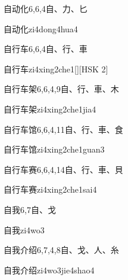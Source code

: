 \begin{entry}{自动化}{6,6,4}{⾃、⼒、⼔}
  \begin{phonetics}{自动化}{zi4dong4hua4}
  \end{phonetics}
\end{entry}

\begin{entry}{自行车}{6,6,4}{⾃、⾏、⾞}
  \begin{phonetics}{自行车}{zi4xing2che1}[][HSK 2]
  \end{phonetics}
\end{entry}

\begin{entry}{自行车架}{6,6,4,9}{⾃、⾏、⾞、⽊}
  \begin{phonetics}{自行车架}{zi4xing2che1jia4}
  \end{phonetics}
\end{entry}

\begin{entry}{自行车馆}{6,6,4,11}{⾃、⾏、⾞、⾷}
  \begin{phonetics}{自行车馆}{zi4xing2che1guan3}
  \end{phonetics}
\end{entry}

\begin{entry}{自行车赛}{6,6,4,14}{⾃、⾏、⾞、⾙}
  \begin{phonetics}{自行车赛}{zi4xing2che1sai4}
  \end{phonetics}
\end{entry}

\begin{entry}{自我}{6,7}{⾃、⼽}
  \begin{phonetics}{自我}{zi4wo3}
  \end{phonetics}
\end{entry}

\begin{entry}{自我介绍}{6,7,4,8}{⾃、⼽、⼈、⽷}
  \begin{phonetics}{自我介绍}{zi4wo3jie4shao4}
  \end{phonetics}
\end{entry}

